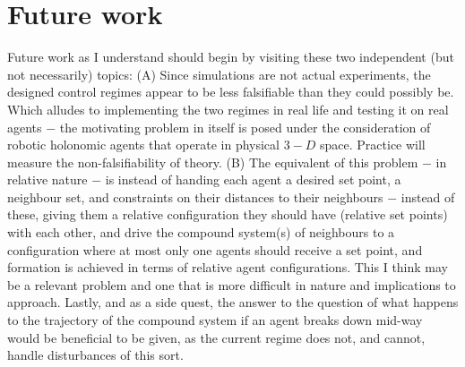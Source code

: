 \chapter{Future work}

Future work as I understand should begin by visiting these two independent (but
not necessarily) topics:
(A) Since simulations are not actual experiments, the designed control regimes
appear to be less falsifiable than they could possibly be. Which alludes to
implementing the two regimes in real life and testing it on real agents $-$ the
motivating problem in itself is posed under the consideration of robotic
holonomic agents that operate in physical $3-D$ space. Practice will measure the
non-falsifiability of theory.
(B) The equivalent of this problem $-$ in relative nature $-$ is instead of
handing each agent a desired set point, a neighbour set, and constraints on
their distances to their neighbours $-$ instead of these, giving them a
relative configuration they should have (relative set points) with each other,
and drive the compound system(s) of neighbours to a configuration where at most
only one agents should receive a set point, and formation is achieved in
terms of relative agent configurations. This I think may be a relevant problem
and one that is more difficult in nature and implications to approach. Lastly,
and as a side quest, the answer to the question of what happens to the
trajectory of the compound system if an agent breaks down mid-way would be
beneficial to be given, as the current regime does not, and cannot, handle
disturbances of this sort.
